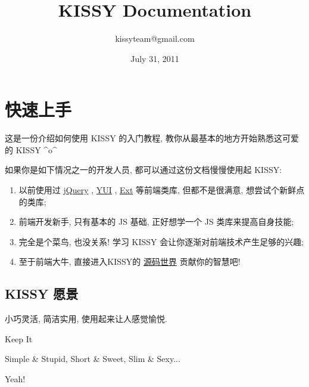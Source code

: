 \documentclass[letterpaper,10pt,english]{sphinxmanual}
\title{KISSY Documentation}
\date{July 31, 2011}
\author{kissyteam@gmail.com}
\begin{document}
\maketitle
\tableofcontents
{}\label{index::doc}



\chapter{快速上手}
\label{quickstart/index:index}\label{quickstart/index::doc}\label{quickstart/index:quickstart}\label{quickstart/index:id1}
这是一份介绍如何使用 KISSY 的入门教程, 教你从最基本的地方开始熟悉这可爱的 KISSY \textasciicircum{}o\textasciicircum{}

如果你是如下情况之一的开发人员, 都可以通过这份文档慢慢使用起 KISSY:
\begin{enumerate}
\item {}
以前使用过 \href{http://jquery.com/}{jQuery} , \href{http://developer.yahoo.com/yui/}{YUI} , \href{http://www.sencha.com/products/js/}{Ext} 等前端类库, 但都不是很满意, 想尝试个新鲜点的类库;

\item {}
前端开发新手, 只有基本的 JS 基础, 正好想学一个 JS 类库来提高自身技能;

\item {}
完全是个菜鸟, 也没关系! 学习 KISSY 会让你逐渐对前端技术产生足够的兴趣;

\item {}
至于前端大牛, 直接进入KISSY的 \href{http://github.com/kissyteam/kissy/tree/master/src/}{源码世界} 贡献你的智慧吧!

\end{enumerate}


\section{KISSY 愿景}
\label{quickstart/index:kissy}
\begin{DUlineblock}{0em}
\item[] 小巧灵活, 简洁实用, 使用起来让人感觉愉悦.
\item[] Keep It
\item[]
\begin{DUlineblock}{\DUlineblockindent}
\item[] Simple \& Stupid, Short \& Sweet, Slim \& Sexy...
\end{DUlineblock}
\item[] Yeah!
\end{DUlineblock}
\end{document}
